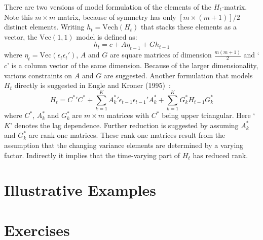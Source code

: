 There are two versions of model formulation of the elements of the $H_t$-matrix. Note this $m \times m$ matrix, because of symmetry has only $[m \times (m+1)]/2$ distinct elements. Writing $h_t=\text{Vech}(H_t)$ that stacks these elements as a vector, the $\text{Vec}(1,1)$ model is defined as:
	\begin{equation}\label{eqn:vecmodel}
	h_t= c + A \eta_{t-1} + G h_{t-1}
	\end{equation}
where $\eta_t=\text{Vec}(\epsilon_t \epsilon_t')$, $A$ and $G$ are square matrices of dimension $\frac{m(m+1)}{2}$ and `$c$' is a column vector of the same dimension. Because of the larger dimensionality, various constraints on $A$ and $G$ are suggested. Another formulation that models $H_t$ directly is suggested in Engle and Kroner (1995)~\cite{kroner}:
	\begin{equation}\label{eqn:kroner}
	H_t=C^*\prime C^* + \sum_{k=1}^K A_k^*\prime \epsilon_{t-1} \epsilon_{t-1}' A_k^* + \sum_{k=1}^K G_k^* H_{t-1}G_k^*
	\end{equation}
where $C^*$, $A_k^*$ and $G_k^*$ are $m \times m$ matrices with $C^*$ being upper triangular. Here `$K$' denotes the lag dependence. Further reduction is suggested by assuming $A_k^*$ and $G_k^*$ are rank one matrices. These rank one matrices result from the assumption that the changing variance elements are determined by a varying factor. Indirectly it implies that the time-varying part of $H_t$ has reduced rank. 

\section{Illustrative Examples}

\section{Exercises}













	
	

